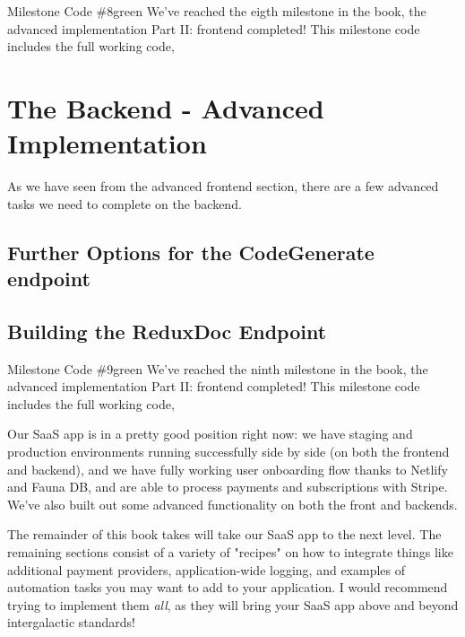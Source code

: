 \documentclass[a4paper,headinclude=on,footinclude=on,12pt,oneside]{scrbook}
\begin{document}
\begin{highlightBox}{Milestone Code \#8}{green}{\greenCheck}
We've reached the eigth milestone in the book, the advanced implementation Part II: frontend completed! This milestone code includes the full working code, 
\end{highlightBox}

\chapter{The Backend - Advanced Implementation}

As we have seen from the advanced frontend section, there are a few advanced tasks we need to complete on the backend.

\section{Further Options for the CodeGenerate endpoint}

\section{Building the ReduxDoc Endpoint}

\begin{highlightBox}{Milestone Code \#9}{green}{\greenCheck}
We've reached the ninth milestone in the book, the advanced implementation Part II: frontend completed! This milestone code includes the full working code, 
\end{highlightBox}


Our SaaS app is in a pretty good position right now: we have staging and production environments running successfully side by side (on both the frontend and backend), and we have fully working user onboarding flow thanks to Netlify and Fauna DB, and are able to process payments and subscriptions with Stripe. We've also built out some advanced functionality on both the front and backends. 

The remainder of this book takes will take our SaaS app to the next level. The remaining sections consist of a variety of "recipes" on how to integrate things like additional payment providers, application-wide logging, and examples of automation tasks you may want to add to your application. I would recommend trying to implement them \textit{all}, as they will bring your SaaS app above and beyond intergalactic standards! \rocket
\end{document}
